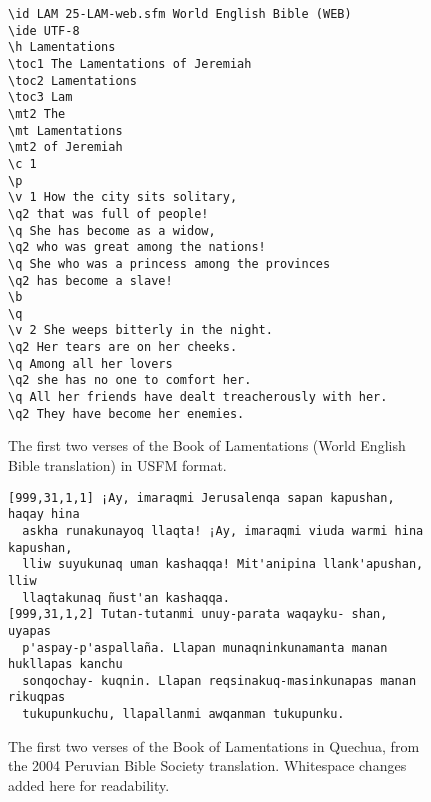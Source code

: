 \begin{figure*}
\raggedright \begin{verbatim}
\id LAM 25-LAM-web.sfm World English Bible (WEB) 
\ide UTF-8
\h Lamentations 
\toc1 The Lamentations of Jeremiah 
\toc2 Lamentations 
\toc3 Lam 
\mt2 The 
\mt Lamentations 
\mt2 of Jeremiah 
\c 1  
\p
\v 1 How the city sits solitary, 
\q2 that was full of people! 
\q She has become as a widow, 
\q2 who was great among the nations! 
\q She who was a princess among the provinces 
\q2 has become a slave! 
\b
\q
\v 2 She weeps bitterly in the night. 
\q2 Her tears are on her cheeks. 
\q Among all her lovers 
\q2 she has no one to comfort her. 
\q All her friends have dealt treacherously with her. 
\q2 They have become her enemies. 
\end{verbatim}
  \caption{The first two verses of the Book of Lamentations (World English
  Bible translation) in USFM format.}
  \label{fig:usfmsample}
\end{figure*}

\begin{figure*}
\raggedright \begin{verbatim}
[999,31,1,1] ¡Ay, imaraqmi Jerusalenqa sapan kapushan, haqay hina
  askha runakunayoq llaqta! ¡Ay, imaraqmi viuda warmi hina kapushan,
  lliw suyukunaq uman kashaqqa! Mit'anipina llank'apushan, lliw
  llaqtakunaq ñust'an kashaqqa.
[999,31,1,2] Tutan-tutanmi unuy-parata waqayku- shan, uyapas
  p'aspay-p'aspallaña. Llapan munaqninkunamanta manan hukllapas kanchu
  sonqochay- kuqnin. Llapan reqsinakuq-masinkunapas manan rikuqpas
  tukupunkuchu, llapallanmi awqanman tukupunku.
\end{verbatim}
  \caption{The first two verses of the Book of Lamentations in Quechua, from
  the 2004 Peruvian Bible Society translation. Whitespace changes added here
  for readability.}
  \label{fig:loza}
\end{figure*}

